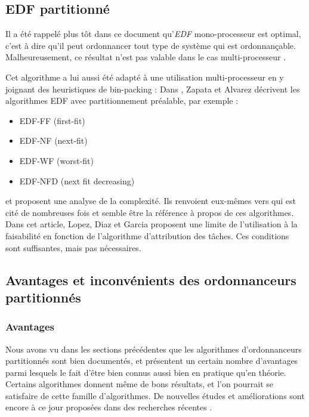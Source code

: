 \documentclass[11pt,a4paper,oneside]{report}
\begin{document}
	
	\subsection{EDF partitionné}
	Il a été rappelé plus tôt dans ce document qu'\textit{EDF} mono-processeur est optimal, 
	c'est à dire qu'il peut ordonnancer tout type de système qui est ordonnançable. 
	Malheureusement, ce résultat n'est pas valable dans le cas multi-processeur \cite{dertouzos_multiprocessor_1989}.\medskip
	
	Cet algorithme a lui aussi été adapté à une utilisation multi-processeur en y joignant 
	des heuristiques de bin-packing : \medskip
	Dans \cite{pereira_zapata_edf_2005}, Zapata et Alvarez décrivent les algorithmes 
	EDF avec partitionnement préalable, par exemple : \medskip
	\begin{itemize}
		\item EDF-FF (first-fit)
		\item EDF-NF (next-fit)
		\item EDF-WF (worst-fit)
		\item EDF-NFD (next fit decreasing)
	\end{itemize}
	et proposent une analyse de la complexité. Ils renvoient eux-mêmes vers 
	\cite{lopez_utilization_2004} 
	qui est cité de nombreuses fois et semble être la référence à propos de ces algorithmes. 
	Dans cet article, Lopez, Diaz et Garcia proposent une limite de l'utilisation à la 
	faisabilité en fonction de l'algorithme d'attribution des tâches. Ces conditions 
	sont suffisantes, mais pas nécessaires.\medskip
	
	
	
	\subsection{Avantages et inconvénients des ordonnanceurs partitionnés}
	\subsubsection{Avantages}
	Nous avons vu dans les sections précédentes que les algorithmes d'ordonnanceurs 
	partitionnés sont bien documentés, et présentent un certain nombre d'avantages parmi lesquels 
	le fait d'être bien connus aussi bien en pratique qu'en théorie. 
	Certains algorithmes donnent même de bons résultats, et l'on pourrait se satisfaire de 
	cette famille d'algorithmes. De nouvelles études et améliorations sont encore à ce jour proposées 
	dans des recherches récentes \cite{rodriguez_paul_multi-criteria_2013}.\medskip
	
\end{document}
